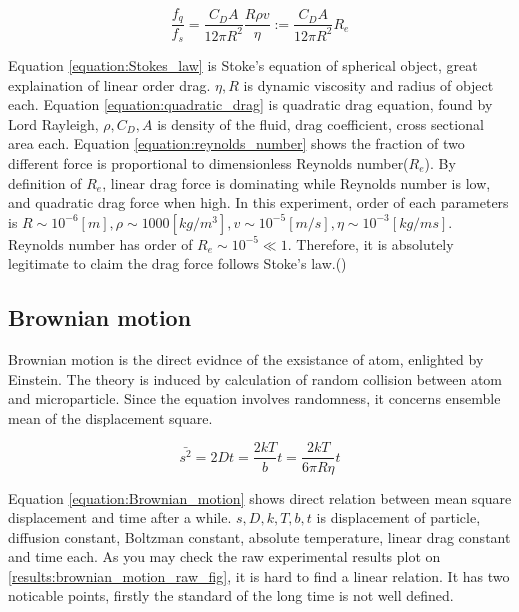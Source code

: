 \documentclass{article}
\begin{document}
\begin{equation}
    \frac{f_q}{f_s} = \frac{C_D A}{12 \pi R^2} \frac{R \rho v}{\eta} := \frac{C_D A}{12 \pi R^2} R_e 
\label{equation:reynolds_number}
\end{equation}

Equation \ref{equation:Stokes_law} is Stoke's equation of spherical object, great explaination of linear order drag. $\eta, R$ is dynamic viscosity and radius of object each.
Equation \ref{equation:quadratic_drag} is quadratic drag equation, found by Lord Rayleigh, $\rho, C_D, A$ is density of the fluid, drag coefficient, cross sectional area each.
Equation \ref{equation:reynolds_number} shows the fraction of two different force is proportional to dimensionless Reynolds number($R_e$).
By definition of $R_e$, linear drag force is dominating while Reynolds number is low, and quadratic drag force when high.
In this experiment, order of each parameters is $R \sim 10^{-6} [m], \rho \sim 1000 [kg/m^3], v \sim 10^{-5} [m/s],\eta \sim 10^{-3} [kg / m s]$.
Reynolds number has order of $R_e \sim 10^{-5} \ll 1$.
Therefore, it is absolutely legitimate to claim the drag force follows Stoke's law.(\cite{Reynolds_number})

\subsection{Brownian motion}
\label{intro:Brownian_motion}

Brownian motion is the direct evidnce of the exsistance of atom, enlighted by Einstein.
The theory is induced by calculation of random collision between atom and microparticle.
Since the equation involves randomness, it concerns ensemble mean of the displacement square.

\begin{equation}
    \bar{s^2}= 2Dt =  \frac{2kT}{b} t  = \frac{2kT}{6 \pi R \eta} t
\label{equation:Brownian_motion}
\end{equation}

Equation \ref{equation:Brownian_motion} shows direct relation between mean square displacement and time after a while.
$s, D, k, T, b, t$ is displacement of particle, diffusion constant, Boltzman constant, absolute temperature, linear drag constant and time each.
As you may check the raw experimental results plot on \ref{results:brownian_motion_raw_fig}, it is hard to find a linear relation.
It has two noticable points, firstly the standard of the long time is not well defined.
\end{document}
